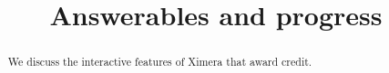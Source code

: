 \documentclass{xourse}
\title{Answerables and progress}
\begin{document}
\begin{abstract}
We discuss the interactive features of Ximera that award credit. 
\end{abstract}
\maketitle
\end{document}
